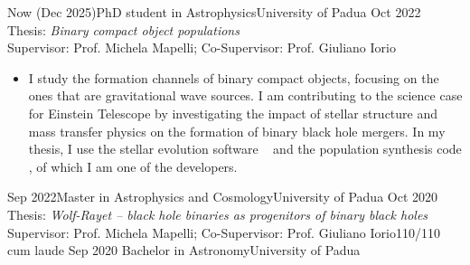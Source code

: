 %
%
%
\begin{experiences}
  \experiencetags
    {Now (Dec 2025)}{PhD student in Astrophysics}{University of Padua}
    {Oct 2022}
    {Thesis: \textit{Binary compact object populations} \\
    Supervisor: Prof. Michela Mapelli; Co-Supervisor: Prof. Giuliano Iorio }{
    \begin{itemize}
        \item I study the formation channels of binary compact objects, focusing on the ones that are gravitational wave sources.  I am contributing to the science case for Einstein Telescope by investigating the impact of stellar structure and mass transfer physics on the formation of binary black hole mergers. In my thesis, I use the stellar evolution software ~ and the population synthesis code , of which I am one of the developers.
    \end{itemize}
   }{}%
  \emptySeparator
  \experiencetagsend
    {Sep 2022}{Master in Astrophysics and Cosmology}{University of Padua}
    {Oct 2020} 
    {Thesis: \textit{Wolf-Rayet -- black hole binaries as progenitors of binary black holes} \\
    Supervisor: Prof. Michela Mapelli; Co-Supervisor: Prof. Giuliano Iorio}{110/110 cum laude}
    {}%
  \emptySeparator
  \experiencetagsend
    {Sep 2020}   {Bachelor in Astronomy}{University of Padua}

\end{experiences}
